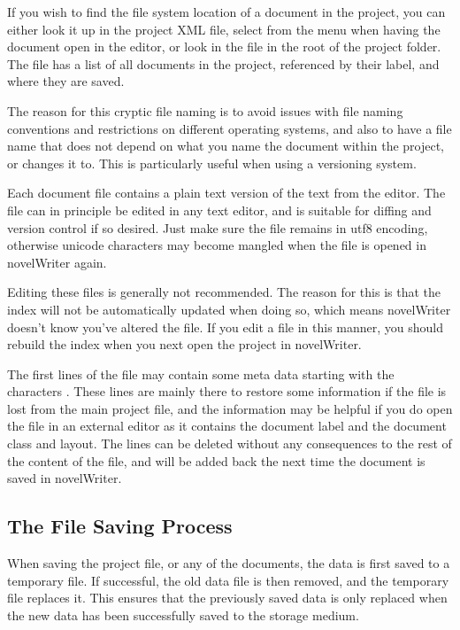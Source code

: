 \documentclass[a4paper,11pt,english]{sphinxmanual}
\begin{document}
\sphinxAtStartPar
If you wish to find the file system location of a document in the project, you can either look it
up in the project XML file, select  from the  menu when having the
document open in the editor, or look in the  file in the root of the project folder. The
 file has a list of all documents in the project, referenced by their label, and where
they are saved.

\sphinxAtStartPar
The reason for this cryptic file naming is to avoid issues with file naming conventions and
restrictions on different operating systems, and also to have a file name that does not depend on
what you name the document within the project, or changes it to. This is particularly useful when
using a versioning system.

\sphinxAtStartPar
Each document file contains a plain text version of the text from the editor. The file can in
principle be edited in any text editor, and is suitable for diffing and version control if so
desired. Just make sure the file remains in utf\sphinxhyphen{}8 encoding, otherwise unicode characters may
become mangled when the file is opened in novelWriter again.

\sphinxAtStartPar
Editing these files is generally not recommended. The reason for this is that the index will not be
automatically updated when doing so, which means novelWriter doesn’t know you’ve altered the file.
If you  edit a file in this manner, you should rebuild the index when you next open the project
in novelWriter.

\sphinxAtStartPar
The first lines of the file may contain some meta data starting with the characters \sphinxcode{\sphinxupquote{\%\%\textasciitilde{}}}. These
lines are mainly there to restore some information if the file is lost from the main project file,
and the information may be helpful if you do open the file in an external editor as it contains the
document label and the document class and layout. The lines can be deleted without any consequences
to the rest of the content of the file, and will be added back the next time the document is saved
in novelWriter.


\subsection{The File Saving Process}
\label{\detokenize{tech_storage:the-file-saving-process}}
\sphinxAtStartPar
When saving the project file, or any of the documents, the data is first saved to a temporary file.
If successful, the old data file is then removed, and the temporary file replaces it. This ensures
that the previously saved data is only replaced when the new data has been successfully saved to
the storage medium.
\end{document}
